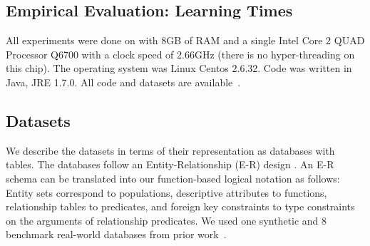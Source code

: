 \documentclass{article}
\begin{document}
%
%


\subsection{Empirical Evaluation: Learning Times} 
All experiments were done on with 8GB of RAM and a single Intel Core 2 QUAD Processor Q6700 with a clock speed of 2.66GHz (there is no hyper-threading on this chip). The operating system was Linux Centos 2.6.32. Code was written in Java, JRE 1.7.0. All code and datasets are available~\cite{bib:jbnsite}. 
\subsection{Datasets}
We describe the datasets in terms of their representation as databases with tables. The databases follow an Entity-Relationship (E-R) design \cite{Ullman1982}. An E-R schema can be translated into our function-based logical notation as follows: Entity sets correspond to populations, descriptive attributes to functions, relationship tables to predicates, and foreign key constraints to type constraints on the arguments of relationship predicates.
%
We used one synthetic and 
8 benchmark real-world databases from prior work~\cite{Schulte2012}. 
\end{document}
